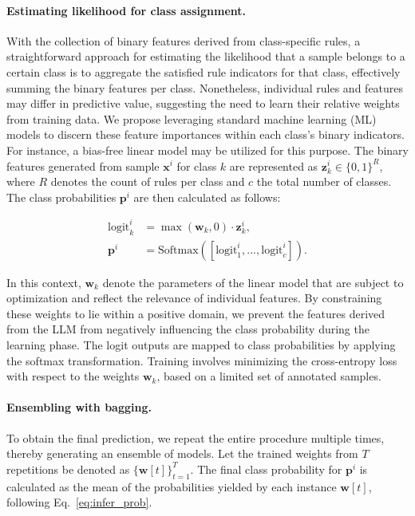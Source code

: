 \paragraph{Estimating likelihood for class assignment.} With the collection of binary features derived from class-specific rules, a straightforward approach for estimating the likelihood that a sample belongs to a certain class is to aggregate the satisfied rule indicators for that class, effectively summing the binary features per class. Nonetheless, individual rules and features may differ in predictive value, suggesting the need to learn their relative weights from training data. We propose leveraging standard machine learning (ML) models to discern these feature importances within each class’s binary indicators. For instance, a bias-free linear model may be utilized for this purpose. The binary features generated from sample $\mathbf{x}^i$ for class $k$ are represented as $\mathbf{z}_k^i \in \{0, 1\}^R$, where $R$ denotes the count of rules per class and $c$ the total number of classes. The class probabilities $\mathbf{p}^i$ are then calculated as follows:

\begin{align}
\text{logit}_k^i &= \max(\mathbf{w}_k, 0) \cdot \mathbf{z}_k^i, \nonumber \\
\mathbf{p}^i &= \text{Softmax}({[\text{logit}_{1}^i, ..., \text{logit}_{c}^i]}). \label{eq:infer_prob}
\end{align}

In this context, $\mathbf{w}_k$ denote the parameters of the linear model that are subject to optimization and reflect the relevance of individual features. By constraining these weights to lie within a positive domain, we prevent the features derived from the LLM from negatively influencing the class probability during the learning phase. The logit outputs are mapped to class probabilities by applying the softmax transformation. Training involves minimizing the cross-entropy loss with respect to the weights $\mathbf{w}_k$, based on a limited set of annotated samples.

\vspace*{-0.12in}
\paragraph{Ensembling with bagging.} To obtain the final prediction, we repeat the entire procedure multiple times, thereby generating an ensemble of models. Let the trained weights from $T$ repetitions be denoted as $\{\mathbf{w}[t]\}_{t=1}^T$. The final class probability for $\mathbf{p}^i$ is calculated as the mean of the probabilities yielded by each instance $\mathbf{w}[t]$, following Eq.~\ref{eq:infer_prob}.

